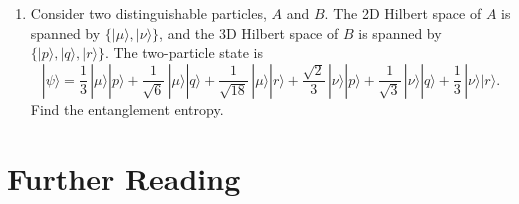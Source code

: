 \documentclass[pra,12pt]{revtex4}
\begin{document}
\begin{enumerate}
\item 
  Consider two distinguishable particles, $A$ and $B$.  The 2D Hilbert
  space of $A$ is spanned by $\{|\mu\rangle, |\nu\rangle\}$, and the
  3D Hilbert space of $B$ is spanned by $\{|p\rangle, |q\rangle,
  |r\rangle\}$.  The two-particle state is
\begin{equation}
  |\psi\rangle = \frac{1}{3} \, |\mu\rangle|p\rangle
+ \frac{1}{\sqrt{6}} \, |\mu\rangle|q\rangle
+ \frac{1}{\sqrt{18}} \, |\mu\rangle|r\rangle
+ \frac{\sqrt{2}}{3} \, |\nu\rangle|p\rangle
+ \frac{1}{\sqrt{3}} \, |\nu\rangle|q\rangle
+ \frac{1}{3} \, |\nu\rangle|r\rangle.
\end{equation}
Find the entanglement entropy.

\end{enumerate}

\section*{Further Reading}
\end{document}
